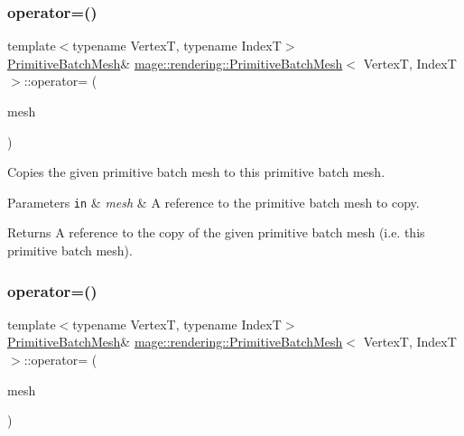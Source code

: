 \subsubsection{\texorpdfstring{operator=()}{operator=()}\hspace{0.1cm}{\footnotesize\ttfamily [1/2]}}
{\footnotesize\ttfamily template$<$typename VertexT, typename IndexT$>$ \\
\mbox{\hyperlink{classmage_1_1rendering_1_1_primitive_batch_mesh}{Primitive\+Batch\+Mesh}}\& \mbox{\hyperlink{classmage_1_1rendering_1_1_primitive_batch_mesh}{mage\+::rendering\+::\+Primitive\+Batch\+Mesh}}$<$ VertexT, IndexT $>$\+::operator= (\begin{DoxyParamCaption}\item[{const \mbox{\hyperlink{classmage_1_1rendering_1_1_primitive_batch_mesh}{Primitive\+Batch\+Mesh}}$<$ VertexT, IndexT $>$ \&}]{mesh }\end{DoxyParamCaption})\hspace{0.3cm}{\ttfamily [delete]}}

Copies the given primitive batch mesh to this primitive batch mesh.


\begin{DoxyParams}[1]{Parameters}
\mbox{\tt in}  & {\em mesh} & A reference to the primitive batch mesh to copy. \\
\hline
\end{DoxyParams}
\begin{DoxyReturn}{Returns}
A reference to the copy of the given primitive batch mesh (i.\+e. this primitive batch mesh). 
\end{DoxyReturn}
\mbox{\label{classmage_1_1rendering_1_1_primitive_batch_mesh_a36409f6de1208f30069309675b19feb2}} 
\subsubsection{\texorpdfstring{operator=()}{operator=()}\hspace{0.1cm}{\footnotesize\ttfamily [2/2]}}
{\footnotesize\ttfamily template$<$typename VertexT, typename IndexT$>$ \\
\mbox{\hyperlink{classmage_1_1rendering_1_1_primitive_batch_mesh}{Primitive\+Batch\+Mesh}}\& \mbox{\hyperlink{classmage_1_1rendering_1_1_primitive_batch_mesh}{mage\+::rendering\+::\+Primitive\+Batch\+Mesh}}$<$ VertexT, IndexT $>$\+::operator= (\begin{DoxyParamCaption}\item[{\mbox{\hyperlink{classmage_1_1rendering_1_1_primitive_batch_mesh}{Primitive\+Batch\+Mesh}}$<$ VertexT, IndexT $>$ \&\&}]{mesh }\end{DoxyParamCaption})\hspace{0.3cm}{\ttfamily [noexcept]}}

